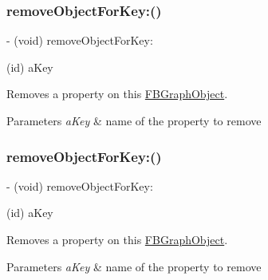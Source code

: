 \subsubsection{\texorpdfstring{remove\+Object\+For\+Key\+:()}{removeObjectForKey:()}\hspace{0.1cm}{\footnotesize\ttfamily [2/5]}}
{\footnotesize\ttfamily -\/ (void) remove\+Object\+For\+Key\+: \begin{DoxyParamCaption}\item[{(id)}]{a\+Key }\end{DoxyParamCaption}}

Removes a property on this {\ttfamily \hyperlink{interfaceFBGraphObject}{F\+B\+Graph\+Object}}.


\begin{DoxyParams}{Parameters}
{\em a\+Key} & name of the property to remove \\
\hline
\end{DoxyParams}
\mbox{\label{protocolFBGraphObject-p_ae70776266993262a70b438421f1e0209}} 
\subsubsection{\texorpdfstring{remove\+Object\+For\+Key\+:()}{removeObjectForKey:()}\hspace{0.1cm}{\footnotesize\ttfamily [3/5]}}
{\footnotesize\ttfamily -\/ (void) remove\+Object\+For\+Key\+: \begin{DoxyParamCaption}\item[{(id)}]{a\+Key }\end{DoxyParamCaption}}

Removes a property on this {\ttfamily \hyperlink{interfaceFBGraphObject}{F\+B\+Graph\+Object}}.


\begin{DoxyParams}{Parameters}
{\em a\+Key} & name of the property to remove \\
\hline
\end{DoxyParams}
\mbox{\label{protocolFBGraphObject-p_ae70776266993262a70b438421f1e0209}} 
